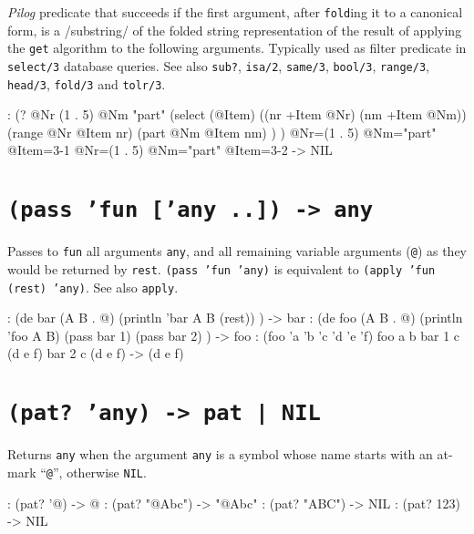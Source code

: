 \emph{Pilog} predicate that succeeds if the first argument, after
\texttt{fold}ing it to a canonical form, is a /substring/ of the
folded string representation of the result of applying the
\texttt{get} algorithm to the following arguments. Typically used as
filter predicate in \texttt{select/3} database queries. See also
\texttt{sub?}, \texttt{isa/2}, \texttt{same/3}, \texttt{bool/3},
\texttt{range/3}, \texttt{head/3}, \texttt{fold/3} and
\texttt{tolr/3}.


\begin{wideverbatim}
: (?
   @Nr (1 . 5)
   @Nm "part"
   (select (@Item)
      ((nr +Item @Nr) (nm +Item @Nm))
      (range @Nr @Item nr)
      (part @Nm @Item nm) ) )
      @Nr=(1 . 5) @Nm="part" @Item={3-1}
      @Nr=(1 . 5) @Nm="part" @Item={3-2}
-> NIL
\end{wideverbatim}

 
\section*{\texttt{(pass 'fun ['any ..]) -> any}}
\label{sec:func-ref-P-(pass 'fun ['any ..]) -> any}


Passes to \texttt{fun} all arguments \texttt{any}, and all remaining variable
arguments (\texttt{@}) as they would be returned by \texttt{rest}. \texttt{(pass 'fun 'any)}
is equivalent to \texttt{(apply 'fun (rest) 'any)}. See also \texttt{apply}.


\begin{wideverbatim}
: (de bar (A B . @)
   (println 'bar A B (rest)) )
-> bar
: (de foo (A B . @)
   (println 'foo A B)
   (pass bar 1)
   (pass bar 2) )
-> foo
: (foo 'a 'b 'c 'd 'e 'f)
foo a b
bar 1 c (d e f)
bar 2 c (d e f)
-> (d e f)
\end{wideverbatim}

 
\section*{\texttt{(pat? 'any) -> pat | NIL}}
\label{sec:func-ref-P-(pat? 'any) -> pat | NIL}


Returns \texttt{any} when the argument \texttt{any} is a symbol whose name starts with
an at-mark ``\texttt{@}'', otherwise \texttt{NIL}.


\begin{wideverbatim}
: (pat? '@)
-> @
: (pat? "@Abc")
-> "@Abc"
: (pat? "ABC")
-> NIL
: (pat? 123)
-> NIL
\end{wideverbatim}

 
